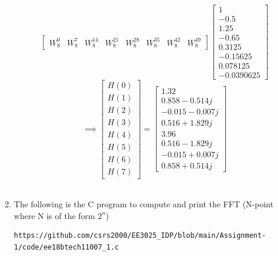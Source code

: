 \documentclass[journal,12pt,twocolumn]{IEEEtran}
\renewcommand\thesection{\arabic{section}}
\begin{document}
\begin{enumerate}[label=\thesection.\arabic*.,ref=\thesection.\theenumi]
\begin{equation}
\begin{bmatrix}
W^{0}_{8} & W^{7}_{8} & W^{14}_{8} & W^{21}_{8} & W^{28}_{8} & W^{35}_{8} & W^{42}_{8} & W^{49}_{8}
\end{bmatrix}
\begin{bmatrix}
1 \\
-0.5 \\
1.25 \\
-0.65 \\
0.3125 \\
-0.15625 \\
0.078125 \\
-0.0390625
\end{bmatrix}
\end{equation}
\begin{equation}
\implies
\begin{bmatrix}
H(0) \\
H(1) \\
H(2) \\
H(3) \\
H(4) \\
H(5) \\
H(6) \\
H(7)
\end{bmatrix}
=
\begin{bmatrix}
1.32 \\
0.858 - 0.514j \\
-0.015-0.007j \\
0.516 +1.829j \\
3.96 \\
0.516 - 1.829j \\
-0.015+0.007j  \\
0.858 + 0.514j
\end{bmatrix}
\end{equation}
\\
\item The following is the C program to compute and print the FFT (N-point where N is of the form $2^{n}$)
\begin{lstlisting}
https://github.com/csrs2000/EE3025_IDP/blob/main/Assignment-1/code/ee18btech11007_1.c
\end{lstlisting}
\end{enumerate}
\end{document}

